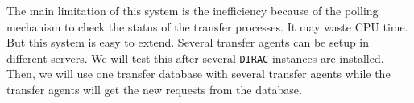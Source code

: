 The main limitation of this system is the inefficiency because of 
the polling mechanism to check the status of the transfer processes.
It may waste CPU time. But this system is easy to extend.
Several transfer agents can be setup in different servers.
We will test this after several {\tt DIRAC} instances are installed.
Then, we will use one transfer database with several transfer agents
while the transfer agents will get the new requests from the database.

